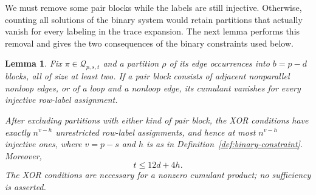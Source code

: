 \documentclass[11pt]{article}
\newtheorem{lemma}[theorem]{Lemma}
\theoremstyle{definition}
\theoremstyle{remark}
\theoremstyle{plain}
\begin{document}
We must remove some pair blocks while the labels are still
injective. Otherwise, counting all solutions of the binary system
would retain partitions that actually vanish for every labeling in
the trace expansion. The next lemma performs this removal and gives
the two consequences of the binary constraints used below.

\begin{lemma}\label{lem:binary-constraints}
Fix $\pi\in\mathcal Q_{p,s,t}$ and a partition $\rho$ of its edge
occurrences into $b=p-d$ blocks, all of size at least two. If a pair
block consists of adjacent nonparallel nonloop edges, or of a loop
and a nonloop edge, its cumulant vanishes for every injective
row-label assignment.

After excluding partitions with either kind of pair block, the XOR
conditions have exactly $n^{v-h}$ unrestricted row-label assignments,
and hence at most $n^{v-h}$ injective ones, where $v=p-s$ and $h$ is
as in Definition~\ref{def:binary-constraint}. Moreover,
\begin{equation}\label{eq:odd-incidence}
                              t\le12d+4h.
\end{equation}
The XOR conditions are necessary for a nonzero cumulant product;
no sufficiency is asserted.
\end{lemma}
\end{document}
